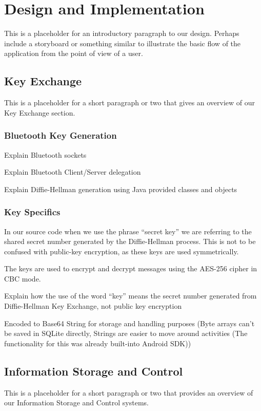 \section{Design and Implementation}
This is a placeholder for an introductory paragraph to our design. Perhaps include a storyboard or something similar to illustrate the basic flow of the application
from the point of view of a user.

\subsection{Key Exchange}
This is a placeholder for a short paragraph or two that gives an overview of our Key Exchange section.

\subsubsection{Bluetooth Key Generation}
Explain Bluetooth sockets

Explain Bluetooth Client/Server delegation

Explain Diffie-Hellman generation using Java provided classes and objects

\subsubsection{Key Specifics}
In our source code when we use the phrase ``secret key'' we are referring to the shared secret number generated by
the Diffie-Hellman process. This is not to be confused with public-key encryption, as these keys are used symmetrically.

The keys are used to encrypt and decrypt messages using the AES-256 cipher in CBC mode.

Explain how the use of the word ``key'' means the secret number generated from Diffie-Hellman Key Exchange, not public key encryption

Encoded to Base64 String for storage and handling purposes (Byte arrays can't be saved in SQLite directly, Strings are easier to move around activities (The functionality for this was already built-into Android SDK))

\subsection{Information Storage and Control}
This is a placeholder for a short paragraph or two that provides an overview of our Information Storage and Control systems.


